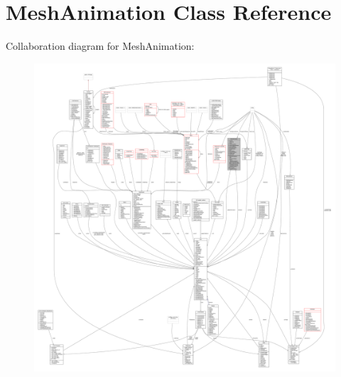 \hypertarget{classMeshAnimation}{}\section{Mesh\+Animation Class Reference}
\label{classMeshAnimation}


Collaboration diagram for Mesh\+Animation\+:
\nopagebreak
\begin{figure}[H]
\begin{center}
\leavevmode
\includegraphics[width=350pt]{d9/d38/classMeshAnimation__coll__graph}
\end{center}
\end{figure}
